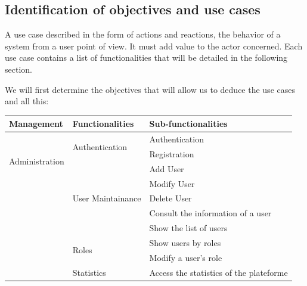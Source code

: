 \subsection{Identification of objectives and use cases}
A use case described in the form of actions and reactions, the behavior of a system from a user point of view. It must add value to the actor concerned. Each use case contains a list of functionalities that will be detailed in the following section.

We will first determine the objectives that will allow us to deduce the use cases and all this:
\begin{longtable}{|m{10em}|m{10em}|m{10em}|}\hline
Management & Functionalities        &   Sub-functionalities                        \\\hline
    \multirow{4}{*}{Administration} & \multirow{2}{*}{Authentication}       & Authentication                          \\\cline{3-3}
                                               &                                       & Registration                            \\\cline{2-3}
                                               & \multirow{5}{*}{User Maintainance}    & Add User                                \\\cline{3-3}
                                               &                                       & Modify User                             \\\cline{3-3}
                                               &                                       & Delete User                             \\\cline{3-3}
                                               &                                       & Consult the information of a user       \\\cline{3-3}
                                               &                                       & Show the list of users                  \\\cline{2-3}
                                               & \multirow{2}{*}{Roles}                & Show users by roles                     \\\cline{3-3}
                                               &                                       & Modify a user's role                    \\\cline{2-3}
                                               & \multirow{1}{*}{Statistics}           & Access the statistics of the plateforme \\\hline

\end{longtable}
